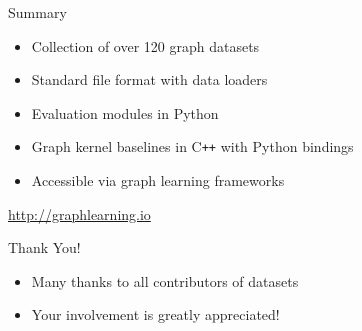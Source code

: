 \documentclass[utf8, xcolor=dvipsnames,ngerman]{beamer}
\begin{document}
\begin{frame}{Summary}

\begin{itemize}
 \item Collection of over 120 graph datasets 
 \item Standard file format with data loaders
 \item Evaluation modules in Python
 \item Graph kernel baselines in C\texttt{++} with Python bindings
 \item Accessible via graph learning frameworks
\end{itemize}

\vspace{1.5em}

\pause

\begin{center}
 \Large{ \url{http://graphlearning.io}}
\end{center}

\vspace{1.5em}

\pause
\begin{block}{Thank You!}
\begin{itemize}
 \item Many thanks to all contributors of datasets
 \item Your involvement is greatly appreciated!
\end{itemize}

\end{block}
\end{frame}
\end{document}
